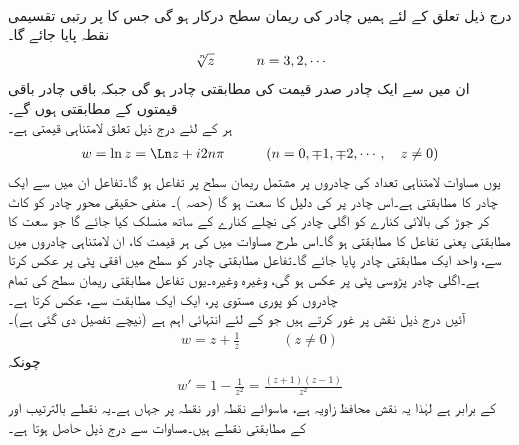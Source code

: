 \quad {}\\
درج ذیل تعلق کے لئے ہمیں  چادر کی ریمان سطح درکار ہو گی جس کا  پر    رتبی تقسیمی نقطہ پایا جائے گا۔
\begin{align}
\sqrt[\leftroot{-2}\uproot{2}n]{z}\quad \quad \quad n=3,2,\cdots
\end{align}
ان میں سے ایک چادر صدر قیمت کی مطابقتی چادر ہو گی جبکہ باقی  چادر باقی  قیمتوں کے مطابقتی ہوں گے۔
\quad {}\\
ہر  کے لئے درج ذیل  تعلق لامتناہی قیمتی ہے۔
\begin{align}\label{مساوات_نقش_ریمان_سطح_لوگارتھم}
w=\ln z=\Ln z+i2n\pi\quad \quad \quad (n=0,\mp1,\mp2,\cdots,\quad z\ne 0)
\end{align}
یوں مساوات  لامتناہی تعداد کی چادروں پر مشتمل ریمان سطح پر تفاعل ہو گا۔تفاعل  ان میں سے ایک چادر  کا مطابقتی ہے۔اس چادر پر  کی دلیل  کا سعت  ہو گا (حصہ )۔ منفی حقیقی محور چادر کو کاٹ کر جوڑ کی بالائی کنارے کو  اگلی چادر کی نچلے کنارے کے ساتھ منسلک کیا جائے گا جو سعت  کا مطابقتی یعنی تفاعل  کا مطابقتی ہو گا۔اس طرح  مساوات  میں  کی ہر قیمت کا، ان لامتناہی چادروں میں سے،  واحد ایک مطابقتی چادر پایا جائے گا۔تفاعل  مطابقتی چادر کو  سطح میں  افقی پٹی  پر عکس کرتا ہے۔اگلی چادر پڑوسی پٹی  پر عکس ہو گی، وغیرہ وغیرہ۔یوں تفاعل  مطابقتی ریمان سطح کی تمام چادروں کو  پوری  مستوی پر، ایک ایک مطابقت سے، عکس کرتا ہے۔
\quad {}\\
آئیں درج ذیل نقش پر غور کرتے ہیں جو  کے لئے انتہائی اہم ہے (نیچے تفصیل دی گئی ہے)۔
\begin{align}\label{مساوات_نقش_ہوائی_حرکیات_الف}
w=z+\frac{1}{z}\quad \quad \quad (z\ne 0)
\end{align}
چونکہ 
\begin{align*}
w'=1-\frac{1}{z^2}=\frac{(z+1)(z-1)}{z^2}
\end{align*}
کے برابر ہے لہٰذا یہ نقش محافظ زاویہ ہے، ماسوائے  نقطہ  اور نقطہ   پر جہاں  ہے۔یہ نقطے بالترتیب  اور  کے مطابقتی نقطے ہیں۔مساوات  سے درج ذیل حاصل ہوتا ہے۔
